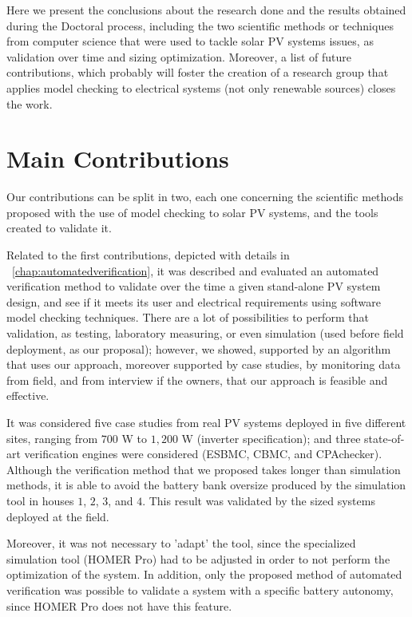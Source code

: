 Here we present the conclusions about the research done and the results obtained during the Doctoral process, including the two scientific methods or techniques from computer science that were used to tackle solar PV systems issues, as validation over time and sizing optimization. Moreover, a list of future contributions, which probably will foster the creation of a research group that applies model checking to electrical systems (not only renewable sources) closes the work.

\section{Main Contributions}

Our contributions can be split in two, each one concerning the scientific methods proposed with the use of model checking to solar PV systems, and the tools created to validate it.

Related to the first contributions, depicted with details in ~\autoref{chap:automatedverification}, it was described and evaluated an automated verification method to validate over the time a given stand-alone PV system design, and see if it meets its user and electrical requirements using software model checking techniques. There are a lot of possibilities to perform that validation, as testing, laboratory measuring, or even simulation (used before field deployment, as our proposal); however, we showed, supported by an algorithm that uses our approach, moreover supported by case studies, by monitoring data from field, and from interview if the owners, that our approach is feasible and effective.

It was considered five case studies from real PV systems deployed in five different sites, ranging from $700$ W to $1,200$ W (inverter specification); and three state-of-art verification engines were considered (ESBMC, CBMC, and CPAchecker). Although the verification method that we proposed takes longer than simulation methods, it is able to avoid the battery bank oversize produced by the simulation tool in houses $1$, $2$, $3$, and $4$. This result was validated by the sized systems deployed at the field.

Moreover, it was not necessary to 'adapt' the tool, since the specialized simulation tool (HOMER Pro) had to be adjusted in order to not perform the optimization of the system. In addition, only the proposed method of automated verification was possible to validate a system with a specific battery autonomy, since HOMER Pro does not have this feature.

